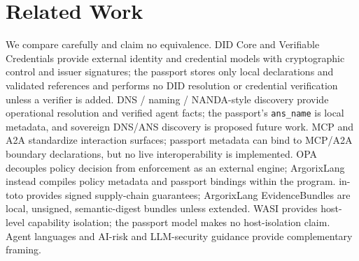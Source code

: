 \documentclass[conference]{IEEEtran}
\newcommand{\code}[1]{\texttt{\small #1}}
\newcommand{\Argorix}{%
\textcolor{argViolet}{A}\textcolor{argViolet}{r}\textcolor{argIndigo}{g}\textcolor{argIndigo}{o}\textcolor{argElectric}{r}\textcolor{argElectric}{i}\textcolor{argElectric}{x}\textcolor{argCyan}{L}\textcolor{argCyan}{a}\textcolor{argCyanBright}{n}\textcolor{argCyanBright}{g}\xspace}
\begin{document}
\section{Related Work}\label{sec:related}
We compare carefully and claim no equivalence. DID Core and Verifiable
Credentials \cite{w3c_did_core_2022,w3c_vc_data_model_2025} provide external
identity and credential models with cryptographic control and issuer signatures;
the passport stores only local declarations and validated references and performs
no DID resolution or credential verification unless a verifier is added. DNS /
naming / NANDA-style discovery
\cite{mockapetris1987dnsconcepts,mockapetris1987dnsimplementation,projectnanda2026,raskar2025beyonddns}
provide operational resolution and verified agent facts; the passport's
\code{ans\_name} is local metadata, and sovereign DNS/ANS discovery is proposed
future work. MCP and A2A \cite{mcp_spec_2025,a2a_spec} standardize interaction
surfaces; passport metadata can bind to MCP/A2A boundary declarations, but no
live interoperability is implemented. OPA \cite{opa_docs} decouples policy
decision from enforcement as an external engine; \Argorix instead compiles
policy metadata and passport bindings within the program. in-toto
\cite{torresarias2019intoto} provides signed supply-chain guarantees; \Argorix
EvidenceBundles are local, unsigned, semantic-digest bundles unless extended.
WASI \cite{wasi_intro} provides host-level capability isolation; the passport
model makes no host-isolation claim. Agent languages
\cite{bordini2007jason} and AI-risk and LLM-security guidance
\cite{tabassi2023airmf,owasp_llm_top10} provide complementary framing.
\end{document}
